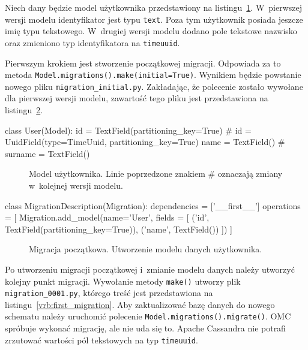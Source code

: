 Niech dany będzie model użytkownika przedstawiony na listingu~\ref{vrb:user_for_migrations}. W~pierwszej wersji modelu identyfikator jest typu \verb+text+. Poza tym użytkownik posiada jeszcze imię typu tekstowego. W~drugiej wersji modelu dodano pole tekstowe nazwisko oraz zmieniono typ identyfikatora na \verb+timeuuid+. 

Pierwszym krokiem jest stworzenie początkowej migracji. Odpowiada za to metoda \verb+Model.migrations().make(initial=True)+. Wynikiem będzie powstanie nowego pliku \verb+migration_initial.py+. Zakładając, że polecenie zostało wywołane dla pierwszej wersji modelu, zawartość tego pliku jest przedstawiona na listingu~\ref{vrb:initial_migration}.

\begin{verbbox}[\footnotesize]
class User(Model):
    id = TextField(partitioning_key=True)
    # id = UuidField(type=TimeUuid, partitioning_key=True)
    name = TextField()
    # surname = TextField()
\end{verbbox}

\begin{figure}[ht!]
	\centering
	\theverbbox
	\caption{Model użytkownika. Linie poprzedzone znakiem \# oznaczają zmiany w~kolejnej wersji modelu.}
	\label{vrb:user_for_migrations}
\end{figure}

\begin{verbbox}[\footnotesize]
class MigrationDescription(Migration):
    dependencies = ['__first__']
    operations = [
        Migration.add_model(name='User',
          fields = [
            ('id', TextField(partitioning_key=True)),
            ('name', TextField()) 
          ])
    ]
\end{verbbox}

\begin{figure}[ht!]
	\centering
	\theverbbox
	\caption{Migracja początkowa. Utworzenie modelu danych użytkownika.}
	\label{vrb:initial_migration}
\end{figure}

Po utworzeniu migracji początkowej i~zmianie modelu danych należy utworzyć kolejny punkt migracji. Wywołanie metody \verb+make()+ utworzy plik \verb+migration_0001.py+, którego treść jest przedstawiona na listingu~\ref{vrb:first_migration}. Aby zaktualizować bazę danych do nowego schematu należy uruchomić polecenie \verb+Model.migrations().migrate()+. OMC spróbuje wykonać migrację, ale nie uda się to. Apache Cassandra nie potrafi zrzutować wartości pól tekstowych na typ \verb+timeuuid+.


